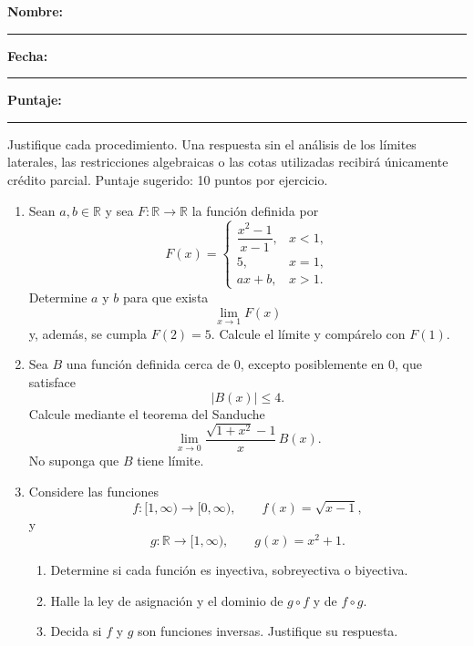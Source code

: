 \documentclass[10pt,a5paper]{article}
\begin{document}

\noindent
\textbf{Nombre:} \rule{7cm}{0.4pt}

\medskip
\noindent
\textbf{Fecha:} \rule{3cm}{0.4pt}
\hfill
\textbf{Puntaje:} \rule{1.5cm}{0.4pt}

\begin{nota}[indicaciones]
Justifique cada procedimiento. Una respuesta sin el análisis de los límites laterales, las restricciones algebraicas o las cotas utilizadas recibirá únicamente crédito parcial. Puntaje sugerido: 10 puntos por ejercicio.
\end{nota}

\begin{ejercicios}
\begin{enumerate}
  \item Sean $a,b\in\mathbb{R}$ y sea $F\colon\mathbb{R}\to\mathbb{R}$ la función definida por
  \[
    F(x)=
    \begin{cases}
      \dfrac{x^2-1}{x-1}, & x<1,\\[2mm]
      5, & x=1,\\
      ax+b, & x>1.
    \end{cases}
  \]
  Determine $a$ y $b$ para que exista
  \[
    \lim_{x\to1}F(x)
  \]
  y, además, se cumpla $F(2)=5$. Calcule el límite y compárelo con $F(1)$.

  \item Sea $B$ una función definida cerca de $0$, excepto posiblemente en $0$, que satisface
  \[
    |B(x)|\leq4.
  \]
  Calcule mediante el teorema del Sanduche
  \[
    \lim_{x\to0}
    \frac{\sqrt{1+x^2}-1}{x}\,B(x).
  \]
  No suponga que $B$ tiene límite.

  \item Considere las funciones
  \[
    f\colon[1,\infty)\to[0,\infty),
    \qquad
    f(x)=\sqrt{x-1},
  \]
  y
  \[
    g\colon\mathbb{R}\to[1,\infty),
    \qquad
    g(x)=x^2+1.
  \]
  \begin{enumerate}
    \item Determine si cada función es inyectiva, sobreyectiva o biyectiva.
    \item Halle la ley de asignación y el dominio de $g\circ f$ y de $f\circ g$.
    \item Decida si $f$ y $g$ son funciones inversas. Justifique su respuesta.
  \end{enumerate}
\end{enumerate}
\end{ejercicios}
\end{document}

